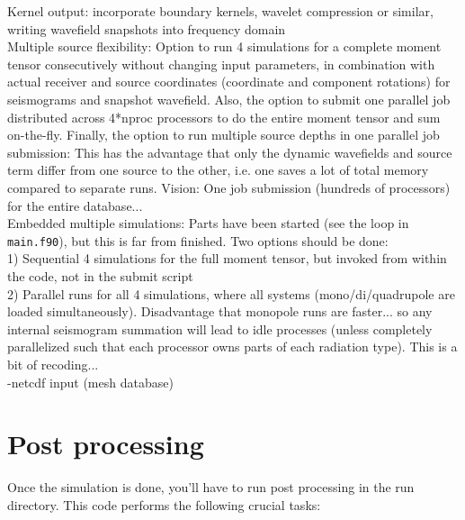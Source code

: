 \documentclass[11pt,letter,fleqn,english,notitlepage]{article}
\begin{document}
\noindent Kernel output: incorporate boundary kernels, wavelet compression or similar, writing wavefield snapshots into
frequency domain\\

\noindent Multiple source flexibility: Option to run 4 simulations for a
complete moment tensor consecutively without changing input parameters, in
combination with actual receiver and source coordinates (coordinate and
component rotations) for seismograms and snapshot wavefield.  Also, the option
to submit one parallel job distributed across 4*nproc processors to do the
entire moment tensor and sum on-the-fly. Finally, the option to run multiple
source depths in one parallel job submission: This has the advantage that only
the dynamic wavefields and source term differ from one source to the other,
i.e. one saves a lot of total memory compared to separate runs. Vision: One job
submission (hundreds of processors) for the entire database...\\

\noindent Embedded multiple simulations: Parts have been started (see the loop in {\tt main.f90}), but this is far from finished. 
  Two options should be done: \\
        1) Sequential 4 simulations for the full moment tensor, but invoked from within the code, not in the submit script\\
        2) Parallel runs for all 4 simulations, where all systems (mono/di/quadrupole are loaded simultaneously). Disadvantage that 
            monopole runs are faster... so any internal seismogram summation
            will lead to idle processes (unless completely parallelized such
            that each processor owns parts of each radiation type). This is a
            bit of recoding...\\

 -netcdf input (mesh database)\\


\newpage
\section{Post processing}
Once the simulation is done, you'll have to run post processing in the run
directory. This code performs the following crucial tasks:
\end{document}

